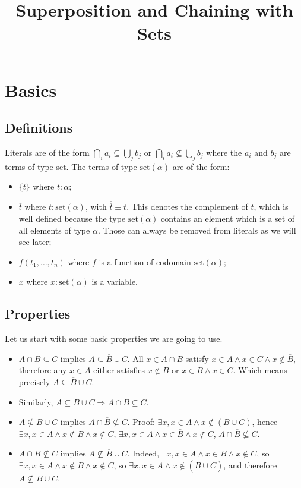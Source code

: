 \documentclass{article}
\title{Superposition and Chaining with Sets}
\newcommand{\set}[1]{\ensuremath{\text{set}({#1})}}
\newcommand{\compl}[1]{\ensuremath{\overline{#1}}}
\begin{document}
\maketitle

\section{Basics}

\subsection{Definitions}
Literals are of the form $\bigcap_i a_i \subseteq \bigcup_j b_j$
or $\bigcap_i a_i \not\subseteq \bigcup_j b_j$ where
the $a_i$ and $b_j$ are terms of type set. 
The terms of type $\set{\alpha}$ are of the form:

\begin{itemize}
    \item $\{ t \}$ where $t : \alpha$;
    \item $\compl{t}$ where $t : \set{\alpha}$, with $\compl{\compl{t}} \equiv t$.
        This denotes the complement of $t$, which is well defined because
        the type $\set{\alpha}$ contains an element which is a set of all
        elements of type $\alpha$. Those can always be removed from literals
        as we will see later;
    \item $ f(t_1,\dots,t_n) $ where $f$ is a function of codomain $\set{\alpha}$;
    \item $ x $ where $x:\set{\alpha}$ is a variable.
\end{itemize}

\subsection{Properties}\label{sec:properties}
Let us start with some basic properties we are going to use.

\begin{itemize}
\item $A \cap B \subseteq C$ implies $A \subseteq \compl{B} \cup C$. All
    $x \in A\cap B$ satisfy $x \in A \land x \in C \land x \not\in \compl{B}$,
    therefore any $x\in A$ either satisfies $x \not\in B$ or $x \in B \land x \in C$.
    Which means precisely $A \subseteq \compl{B} \cup C$.
\item Similarly, $A \subseteq B \cup C \Rightarrow A \cap \compl{B} \subseteq C$.
\item $A \not\subseteq B \cup C$ implies $A \cap \compl{B} \not\subseteq C$.
    Proof:
    $\exists x, x \in A \land x \not\in (B \cup C)$, hence
    $\exists x, x \in A \land x \not\in B \land x \not\in C$,
    $\exists x, x \in A \land x \in \compl{B} \land x \not\in C$,
    $A \cap \compl{B} \not\subseteq C$.
\item $A \cap B \not\subseteq C$ implies $A \not\subseteq \compl{B}\cup C$.
    Indeed, $\exists x, x \in A \land x \in B \land x \not\in C$, so
    $\exists x, x \in A \land x \not\in \compl{B} \land x \not\in C$,
    so $\exists x, x\in A \land x \not\in (\compl{B} \cup C)$, and
    therefore $A \not\subseteq \compl{B} \cup C$.
\end{itemize}
\end{document}
